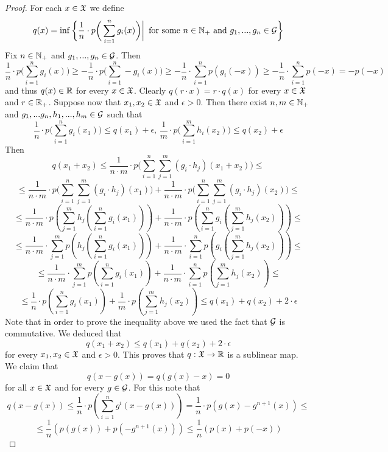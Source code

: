 \begin{proof}
For each $x \in {\mathfrak X}$ we define
$$q(x) = \inf \bigg\{\frac{1}{n}\cdot p\bigg(\sum_{i=1}^ng_i(x)\bigg)\bigg|\,\mbox{ for some }n\in {\mathbb N}_+\mbox{ and }g_1,...,g_n\in {\mathcal G}\bigg\}$$
Fix $n\in {\mathbb N}_+$ and $g_1,...,g_n\in {\mathcal G}$. Then
$$\frac{1}{n}\cdot p\bigg(\sum_{i=1}^ng_i(x)\bigg)\geq -\frac{1}{n}\cdot p\bigg(\sum_{i=1}^n-g_i(x)\bigg) \geq -\frac{1}{n}\cdot \sum_{i=1}^np\left(g_i(-x)\right) \geq -\frac{1}{n}\cdot \sum_{i=1}^np\left(-x\right) = -p(-x)$$
and thus $q(x) \in {\mathbb R}$ for every $x\in {\mathfrak X}$. Clearly $q(r\cdot x) = r\cdot q(x)$ for every $x\in {\mathfrak X}$ and $r\in {\mathbb R}_+$. Suppose now that $x_1,x_2\in {\mathfrak X}$ and $\epsilon > 0$. Then there exist $n,m \in {\mathbb N}_+$ and $g_1,...g_n,h_1,...,h_m \in {\mathcal G}$ such that 
$$\frac{1}{n}\cdot p\bigg(\sum_{i=1}^ng_i(x_1)\bigg) \leq q(x_1) + \epsilon,\,\frac{1}{m}\cdot p\bigg(\sum_{i=1}^m h_i(x_2)\bigg) \leq q(x_2) + \epsilon$$
Then
$$q(x_1 + x_2) \leq \frac{1}{n\cdot m}\cdot p\bigg(\sum_{i=1}^n\sum_{j=1}^m\left(g_i\cdot h_j\right)(x_1 + x_2)\bigg) \leq$$
$$\leq \frac{1}{n\cdot m}\cdot p\bigg(\sum_{i=1}^n\sum_{j=1}^m \left(g_i\cdot h_j\right)(x_1)\bigg) + \frac{1}{n\cdot m}\cdot p\bigg(\sum_{i=1}^n\sum_{j=1}^m\left(g_i\cdot h_j\right)(x_2)\bigg) \leq$$
$$\leq \frac{1}{n\cdot m}\cdot p\left(\sum_{j=1}^m h_j\left(\sum_{i=1}^n g_i\left(x_1\right)\right)\right) + \frac{1}{n\cdot m}\cdot p\left(\sum_{i=1}^n g_i\left(\sum_{j=1}^m h_j\left(x_2\right)\right)\right) \leq $$
$$\leq \frac{1}{n\cdot m}\cdot \sum_{j=1}^m p\left(h_j\left(\sum_{i=1}^n g_i\left(x_1\right)\right)\right) + \frac{1}{n\cdot m}\cdot \sum_{i=1}^n p\left(g_i\left(\sum_{j=1}^m h_j\left(x_2\right)\right)\right) \leq $$
$$\leq \frac{1}{n\cdot m}\cdot \sum_{j=1}^m p\left(\sum_{i=1}^n g_i\left(x_1\right)\right) + \frac{1}{n\cdot m}\cdot \sum_{i=1}^n p\left(\sum_{j=1}^m h_j\left(x_2\right)\right) \leq $$
$$\leq  \frac{1}{n}\cdot p\left(\sum_{i=1}^n g_i\left(x_1\right)\right) + \frac{1}{m}\cdot p\left(\sum_{j=1}^m h_j\left(x_2\right)\right) \leq q(x_1) + q(x_2) + 2\cdot \epsilon$$
Note that in order to prove the inequality above we used the fact that ${\mathcal G}$ is commutative. We deduced that
$$q(x_1 + x_2) \leq q(x_1) + q(x_2) + 2\cdot \epsilon$$
for every $x_1,x_2\in {\mathfrak X}$ and $\epsilon > 0$. This proves that $q:{\mathfrak X} \rightarrow {\mathbb R}$ is a sublinear map. We claim that 
$$q\left(x - g(x)\right) = q\left(g(x) - x\right) = 0$$
for all $x\in {\mathfrak X}$ and for every $g\in {\mathcal G}$. For this note that
$$q\left(x - g(x)\right) \leq \frac{1}{n}\cdot p\left(\sum_{i=1}^ng^i\left(x - g(x)\right)\right) = \frac{1}{n}\cdot p\left(g(x) - g^{n+1}(x)\right) \leq$$
$$\leq \frac{1}{n}\left(p\left(g(x)\right) + p\left(-g^{n+1}(x)\right)\right) \leq \frac{1}{n}\left(p(x) + p(-x)\right)$$

\end{proof}
